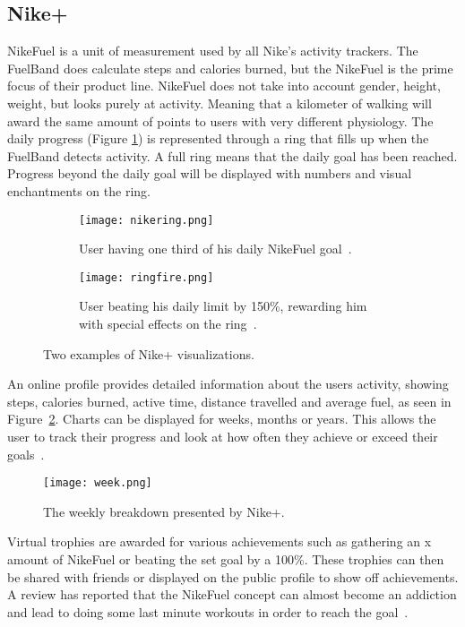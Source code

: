 \subsection{Nike+}
NikeFuel \cite{nikefuel} is a unit of measurement used by all Nike's activity trackers. The FuelBand does calculate steps and calories burned, but the NikeFuel is the prime focus of their product line. NikeFuel does not take into account gender, height, weight, but looks purely at activity. Meaning that a kilometer of walking will award the same amount of points to users with very different physiology. The daily progress (Figure \ref{fig:tworings}) is represented through a ring that fills up when the FuelBand detects activity. A full ring means that the daily goal has been reached. Progress beyond the daily goal will be displayed with numbers and visual enchantments on the ring. 


\begin{figure}[h!]
 \centering
  \begin{subfigure}[b]{0.49\textwidth}
    \centering
    \texttt{[image: nikering.png]}
    \caption{User having one third of his daily NikeFuel goal~\cite{fuelbandDcRain}.}
  \end{subfigure}
  \begin{subfigure}[b]{0.49\textwidth}
    \centering
    \texttt{[image: ringfire.png]}
    \caption{User beating his daily limit by 150\%, rewarding him with special effects on the ring~\cite{fuelbandTechSpce}.}
  \end{subfigure} 
  \caption[Nike+ visualisations]{Two examples of Nike+ visualizations.}
  \label{fig:tworings}
\end{figure}

An online profile provides detailed information about the users activity, showing steps, calories burned, active time, distance travelled and average fuel, as seen in Figure~\ref{fig:activityBreakdown}. Charts can be displayed for weeks, months or years. This allows the user to track their progress and look at how often they achieve or exceed their goals~\cite{fuelbandTechSpce}. 

\begin{figure}[h!]
	\centering
		\texttt{[image: week.png]}
		\caption[Weekly breakdown (Nike)]{The weekly breakdown presented by Nike+. \cite{fuelbandTechSpce}}
		\label{fig:activityBreakdown}
\end{figure}

Virtual trophies are awarded for various achievements such as gathering an x amount of NikeFuel or beating the set goal by a 100\%. These trophies can then be shared with friends or displayed on the public profile to show off achievements. A review has reported that the NikeFuel concept can almost become an addiction and lead to doing some last minute workouts in order to reach the goal~\cite{fuelbandDcRain}.

